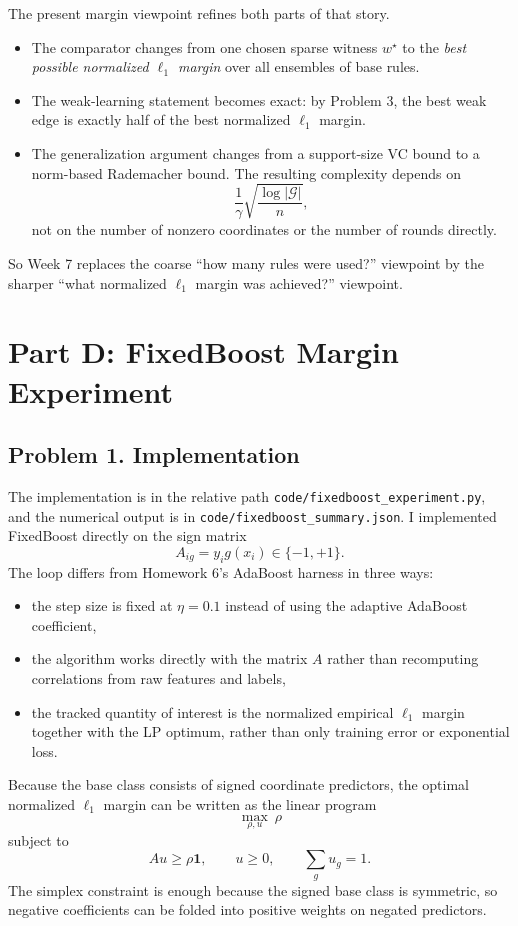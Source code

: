 \documentclass{article}
\newcommand{\cG}{\mathcal{G}}
\newcommand{\one}{\mathbf{1}}
\begin{document}
The present margin viewpoint refines both parts of that story.
\begin{itemize}
\item The comparator changes from one chosen sparse witness $w^\star$ to the \emph{best possible normalized $\ell_1$ margin} over all ensembles of base rules.
\item The weak-learning statement becomes exact: by Problem 3, the best weak edge is exactly half of the best normalized $\ell_1$ margin.
\item The generalization argument changes from a support-size VC bound to a norm-based Rademacher bound. The resulting complexity depends on
$$
\frac{1}{\gamma}\sqrt{\frac{\log |\cG|}{n}},
$$
not on the number of nonzero coordinates or the number of rounds directly.
\end{itemize}

So Week 7 replaces the coarse ``how many rules were used?'' viewpoint by the sharper ``what normalized $\ell_1$ margin was achieved?'' viewpoint.

\newpage
\section{\texorpdfstring{Part D: FixedBoost Margin Experiment}{Part D: FixedBoost Margin Experiment}}

\subsection{Problem 1. Implementation}

The implementation is in the relative path \verb|code/fixedboost_experiment.py|, and the numerical output is in \verb|code/fixedboost_summary.json|. I implemented FixedBoost directly on the sign matrix
$$
A_{ig}=y_i g(x_i)\in\{-1,+1\}.
$$
The loop differs from Homework 6's AdaBoost harness in three ways:
\begin{itemize}
\item the step size is fixed at $\eta=0.1$ instead of using the adaptive AdaBoost coefficient,
\item the algorithm works directly with the matrix $A$ rather than recomputing correlations from raw features and labels,
\item the tracked quantity of interest is the normalized empirical $\ell_1$ margin together with the LP optimum, rather than only training error or exponential loss.
\end{itemize}

Because the base class consists of signed coordinate predictors, the optimal normalized $\ell_1$ margin can be written as the linear program
$$
\max_{\rho,u}\ \rho
$$
subject to
$$
Au \ge \rho \one,
\qquad
u\ge 0,
\qquad
\sum_g u_g = 1.
$$
The simplex constraint is enough because the signed base class is symmetric, so negative coefficients can be folded into positive weights on negated predictors.
\end{document}
